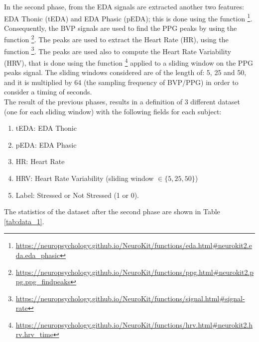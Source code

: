 In the second phase, from the EDA signals are extracted another two features: EDA Thonic (tEDA) and EDA Phasic (pEDA); this is done using the function \footnote{\url{https://neuropsychology.github.io/NeuroKit/functions/eda.html#neurokit2.eda.eda_phasic}}. Consequently, the BVP signals are used to find the PPG peaks by using the function \footnote{\url{https://neuropsychology.github.io/NeuroKit/functions/ppg.html#neurokit2.ppg.ppg_findpeaks}}. The peaks are used to extract the Heart Rate (HR), using the function \footnote{\url{https://neuropsychology.github.io/NeuroKit/functions/signal.html#signal-rate}}. The peaks are used also to compute the Heart Rate Variability (HRV), that is done using the function \footnote{\url{https://neuropsychology.github.io/NeuroKit/functions/hrv.html#neurokit2.hrv.hrv_time}} applied to a sliding window on the PPG peaks signal. The sliding windows considered are of the length of: 5, 25 and 50, and it is multiplied by 64 (the sampling frequency of BVP/PPG) in order to consider a timing of seconds. \\

The result of the previous phases, results in a definition of 3 different dataset (one for each sliding window) with the following fields for each subject:

\begin{enumerate}
    \item tEDA: EDA Thonic
    \item pEDA: EDA Phasic
    \item HR: Heart Rate
    \item HRV: Heart Rate Variability (sliding window $\in \{5, 25, 50\}$)
    \item Label: Stressed or Not Stressed (1 or 0).
\end{enumerate}

The statistics of the dataset after the second phase are shown in Table \ref{tab:data_1}.

